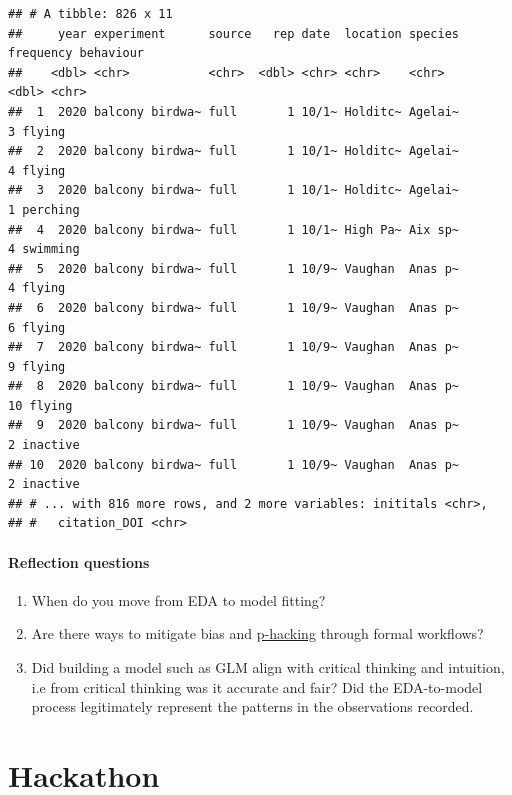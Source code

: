 \documentclass[
]{book}
\providecommand{\tightlist}{%
  \setlength{\itemsep}{0pt}\setlength{\parskip}{0pt}}
\begin{document}
\begin{verbatim}
## # A tibble: 826 x 11
##     year experiment      source   rep date  location species frequency behaviour
##    <dbl> <chr>           <chr>  <dbl> <chr> <chr>    <chr>       <dbl> <chr>    
##  1  2020 balcony birdwa~ full       1 10/1~ Holditc~ Agelai~         3 flying   
##  2  2020 balcony birdwa~ full       1 10/1~ Holditc~ Agelai~         4 flying   
##  3  2020 balcony birdwa~ full       1 10/1~ Holditc~ Agelai~         1 perching 
##  4  2020 balcony birdwa~ full       1 10/1~ High Pa~ Aix sp~         4 swimming 
##  5  2020 balcony birdwa~ full       1 10/9~ Vaughan  Anas p~         4 flying   
##  6  2020 balcony birdwa~ full       1 10/9~ Vaughan  Anas p~         6 flying   
##  7  2020 balcony birdwa~ full       1 10/9~ Vaughan  Anas p~         9 flying   
##  8  2020 balcony birdwa~ full       1 10/9~ Vaughan  Anas p~        10 flying   
##  9  2020 balcony birdwa~ full       1 10/9~ Vaughan  Anas p~         2 inactive 
## 10  2020 balcony birdwa~ full       1 10/9~ Vaughan  Anas p~         2 inactive 
## # ... with 816 more rows, and 2 more variables: inititals <chr>,
## #   citation_DOI <chr>
\end{verbatim}

\hypertarget{reflection-questions-3}{%
\subsubsection*{Reflection questions}\label{reflection-questions-3}}

\begin{enumerate}
\def\labelenumi{\arabic{enumi}.}
\tightlist
\item
  When do you move from EDA to model fitting?\\
\item
  Are there ways to mitigate bias and \href{https://www.wired.com/story/were-all-p-hacking-now/}{p-hacking} through formal workflows?\\
\item
  Did building a model such as GLM align with critical thinking and intuition, i.e from critical thinking was it accurate and fair? Did the EDA-to-model process legitimately represent the patterns in the observations recorded.
\end{enumerate}

\hypertarget{hackathon}{%
\chapter{Hackathon}\label{hackathon}}
\end{document}
